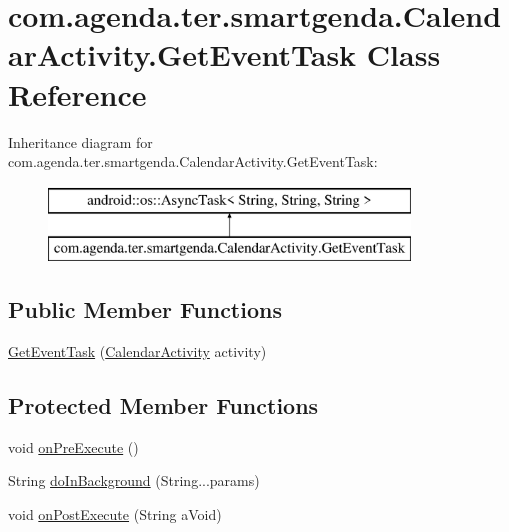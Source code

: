 \hypertarget{classcom_1_1agenda_1_1ter_1_1smartgenda_1_1_calendar_activity_1_1_get_event_task}{\section{com.\-agenda.\-ter.\-smartgenda.\-Calendar\-Activity.\-Get\-Event\-Task Class Reference}
\label{classcom_1_1agenda_1_1ter_1_1smartgenda_1_1_calendar_activity_1_1_get_event_task}
}
Inheritance diagram for com.\-agenda.\-ter.\-smartgenda.\-Calendar\-Activity.\-Get\-Event\-Task\-:\begin{figure}[H]
\begin{center}
\leavevmode
\includegraphics[height=2.000000cm]{classcom_1_1agenda_1_1ter_1_1smartgenda_1_1_calendar_activity_1_1_get_event_task}
\end{center}
\end{figure}
\subsection*{Public Member Functions}
\begin{DoxyCompactItemize}
\item 
\hyperlink{classcom_1_1agenda_1_1ter_1_1smartgenda_1_1_calendar_activity_1_1_get_event_task_a374b9066598cd4320f4901bb3d99f6a8}{Get\-Event\-Task} (\hyperlink{classcom_1_1agenda_1_1ter_1_1smartgenda_1_1_calendar_activity}{Calendar\-Activity} activity)
\end{DoxyCompactItemize}
\subsection*{Protected Member Functions}
\begin{DoxyCompactItemize}
\item 
void \hyperlink{classcom_1_1agenda_1_1ter_1_1smartgenda_1_1_calendar_activity_1_1_get_event_task_a3cba4d7cd3a2d83149ba678edc7d5fd1}{on\-Pre\-Execute} ()
\item 
String \hyperlink{classcom_1_1agenda_1_1ter_1_1smartgenda_1_1_calendar_activity_1_1_get_event_task_af73361290e372bfd433cdd585514ef20}{do\-In\-Background} (String...\-params)
\item 
void \hyperlink{classcom_1_1agenda_1_1ter_1_1smartgenda_1_1_calendar_activity_1_1_get_event_task_a8bc1ac794172fc550229e04da5b3ef35}{on\-Post\-Execute} (String a\-Void)
\end{DoxyCompactItemize}


